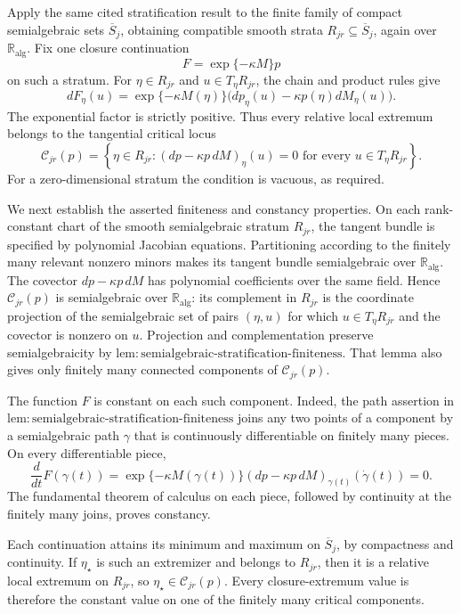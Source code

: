 Apply the same cited stratification result to the finite family of compact semialgebraic sets \(\overline S_j\), obtaining compatible smooth strata \(R_{jr}\subseteq\overline S_j\), again over \(\mathbb R_{\mathrm{alg}}\).  Fix one closure continuation
\[
 F=\exp\{-\kappa M\}p
\]
on such a stratum.  For \(\eta\in R_{jr}\) and \(u\in T_\eta R_{jr}\), the chain and product rules give
\[
 dF_\eta(u)=\exp\{-\kappa M(\eta)\}
 \bigl(dp_\eta(u)-\kappa p(\eta)dM_\eta(u)\bigr).
\]
The exponential factor is strictly positive.  Thus every relative local extremum belongs to the tangential critical locus
\[
 \mathcal C_{jr}(p)=
 \left\{\eta\in R_{jr}:
 (dp-\kappa p\,dM)_\eta(u)=0
 \text{ for every }u\in T_\eta R_{jr}\right\}.
\]
For a zero-dimensional stratum the condition is vacuous, as required.

We next establish the asserted finiteness and constancy properties.  On each rank-constant chart of the smooth semialgebraic stratum \(R_{jr}\), the tangent bundle is specified by polynomial Jacobian equations.  Partitioning according to the finitely many relevant nonzero minors makes its tangent bundle semialgebraic over \(\mathbb R_{\mathrm{alg}}\).  The covector \(dp-\kappa p\,dM\) has polynomial coefficients over the same field.  Hence \(\mathcal C_{jr}(p)\) is semialgebraic over \(\mathbb R_{\mathrm{alg}}\): its complement in \(R_{jr}\) is the coordinate projection of the semialgebraic set of pairs \((\eta,u)\) for which \(u\in T_\eta R_{jr}\) and the covector is nonzero on \(u\).  Projection and complementation preserve semialgebraicity by \(\mathrm{lem{:}semialgebraic\text{-}stratification\text{-}finiteness}\).  That lemma also gives only finitely many connected components of \(\mathcal C_{jr}(p)\).

The function \(F\) is constant on each such component.  Indeed, the path assertion in \(\mathrm{lem{:}semialgebraic\text{-}stratification\text{-}finiteness}\) joins any two points of a component by a semialgebraic path \(\gamma\) that is continuously differentiable on finitely many pieces.  On every differentiable piece,
\[
 \frac{d}{dt}F(\gamma(t))
 =\exp\{-\kappa M(\gamma(t))\}
 (dp-\kappa p\,dM)_{\gamma(t)}(\dot\gamma(t))=0.
\]
The fundamental theorem of calculus on each piece, followed by continuity at the finitely many joins, proves constancy.

Each continuation attains its minimum and maximum on \(\overline S_j\), by compactness and continuity.  If \(\eta_\star\) is such an extremizer and belongs to \(R_{jr}\), then it is a relative local extremum on \(R_{jr}\), so \(\eta_\star\in\mathcal C_{jr}(p)\).  Every closure-extremum value is therefore the constant value on one of the finitely many critical components.

